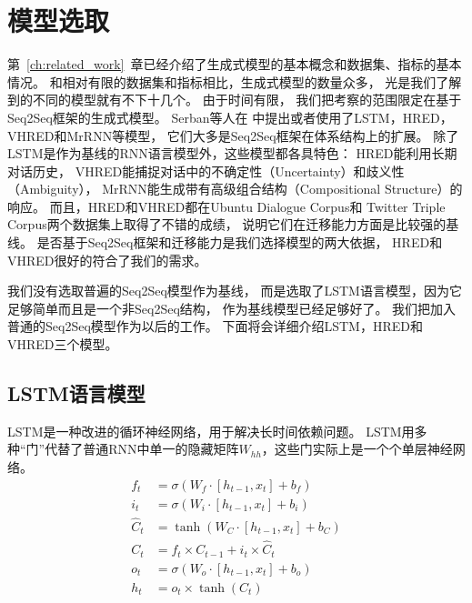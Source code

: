 \section{模型选取}\label{sec:model_selection}
第~\ref{ch:related_work}~章已经介绍了生成式模型的基本概念和数据集、指标的基本情况。
和相对有限的数据集和指标相比，生成式模型的数量众多，
光是我们了解到的不同的模型就有不下十几个。
由于时间有限，
我们把考察的范围限定在基于Seq2Seq框架的生成式模型。
Serban等人在
中提出或者使用了LSTM，HRED，VHRED和MrRNN等模型，
它们大多是Seq2Seq框架在体系结构上的扩展。
除了LSTM是作为基线的RNN语言模型外，这些模型都各具特色：
HRED能利用长期对话历史，
VHRED能捕捉对话中的不确定性（Uncertainty）和歧义性（Ambiguity），
MrRNN能生成带有高级组合结构（Compositional Structure）的响应。
而且，HRED和VHRED都在Ubuntu Dialogue Corpus和
Twitter Triple Corpus两个数据集上取得了不错的成绩，
说明它们在迁移能力方面是比较强的基线。
是否基于Seq2Seq框架和迁移能力是我们选择模型的两大依据，
HRED和VHRED很好的符合了我们的需求。

我们没有选取普遍的Seq2Seq模型作为基线，
而是选取了LSTM语言模型，因为它足够简单而且是一个非Seq2Seq结构，
作为基线模型已经足够好了。
我们把加入普通的Seq2Seq模型作为以后的工作。
下面将会详细介绍LSTM，HRED和VHRED三个模型。

\subsection{LSTM语言模型}\label{subsec:LSTM}
LSTM是一种改进的循环神经网络，用于解决长时间依赖问题。
LSTM用多种“门”代替了普通RNN中单一的隐藏矩阵$W_{hh}$，这些门实际上是一个个单层神经网络。
\begin{align}
    f_t &= \sigma(W_f \cdot [h_{t-1}, x_t] + b_f) \\
    i_t &= \sigma(W_i \cdot [h_{t-1}, x_t] + b_i) \\
    \hat{C}_t &= \tanh(W_C \cdot [h_{t-1}, x_t] + b_C) \\
    C_t &= f_t \times C_{t-1} + i_t \times \hat{C}_t \\
    o_t &= \sigma(W_o \cdot [h_{t-1}, x_t] + b_o) \\
    h_t &= o_t \times \tanh(C_t)
    \label{eqn:LSTM_formula}
\end{align}

